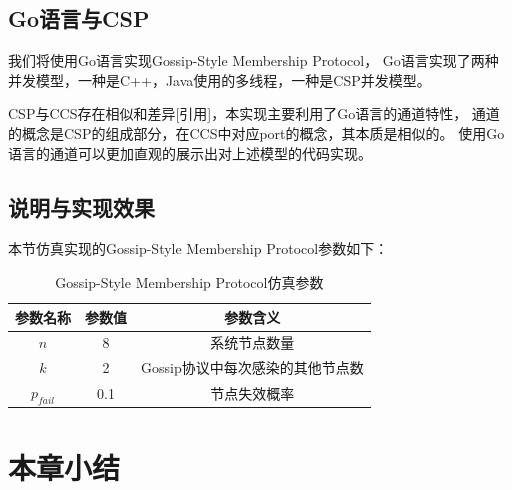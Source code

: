 \subsection{Go语言与CSP}
我们将使用Go语言实现Gossip-Style Membership Protocol，
Go语言实现了两种并发模型，一种是C++，Java使用的多线程，一种是CSP并发模型。

CSP与CCS存在相似和差异[引用]，本实现主要利用了Go语言的通道特性，
通道的概念是CSP的组成部分，在CCS中对应port的概念，其本质是相似的。
使用Go语言的通道可以更加直观的展示出对上述模型的代码实现。

\subsection{说明与实现效果}
本节仿真实现的Gossip-Style Membership Protocol参数如下：
\begin{table}[!hpt]
   \caption[Gossip-Style Membership Protocol仿真参数]{Gossip-Style Membership Protocol仿真参数\footnotemark}
   \label{tab:thirdone}
   \centering
   \begin{tabular}{@{}ccc@{}} \toprule
     参数名称 & 参数值 & 参数含义 \\ \midrule
     $n$ & 8 & 系统节点数量\\
     $k$ & 2 & Gossip协议中每次感染的其他节点数\\
     $p_{fail}$ & 0.1 & 节点失效概率\\ \bottomrule
   \end{tabular}
 \end{table}

 \section{本章小结}